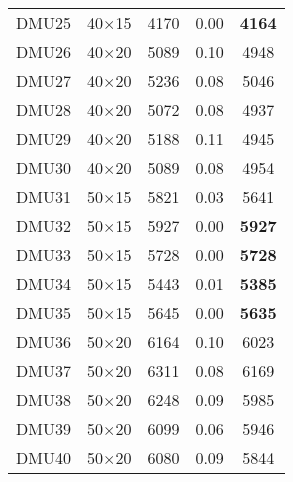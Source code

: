 \begin{table}[H]
\begin{tabular}{@{}ccccc@{}}
DMU25 & 40$\times$15 & 4170 & 0.00 & \textbf{4164}\\ 
DMU26 & 40$\times$20 & 5089 & 0.10 & 4948\\ 
DMU27 & 40$\times$20 & 5236 & 0.08 & 5046\\ 
DMU28 & 40$\times$20 & 5072 & 0.08 & 4937\\ 
DMU29 & 40$\times$20 & 5188 & 0.11 & 4945\\ 
DMU30 & 40$\times$20 & 5089 & 0.08 & 4954\\ 
DMU31 & 50$\times$15 & 5821 & 0.03 & 5641\\ 
DMU32 & 50$\times$15 & 5927 & 0.00 & \textbf{5927}\\ 
DMU33 & 50$\times$15 & 5728 & 0.00 & \textbf{5728}\\ 
DMU34 & 50$\times$15 & 5443 & 0.01 & \textbf{5385}\\ 
DMU35 & 50$\times$15 & 5645 & 0.00 & \textbf{5635}\\ 
DMU36 & 50$\times$20 & 6164 & 0.10 & 6023\\ 
DMU37 & 50$\times$20 & 6311 & 0.08 & 6169\\ 
DMU38 & 50$\times$20 & 6248 & 0.09 & 5985\\ 
DMU39 & 50$\times$20 & 6099 & 0.06 & 5946\\ 
DMU40 & 50$\times$20 & 6080 & 0.09 & 5844\\ \bottomrule
\end{tabular}
\end{table}

